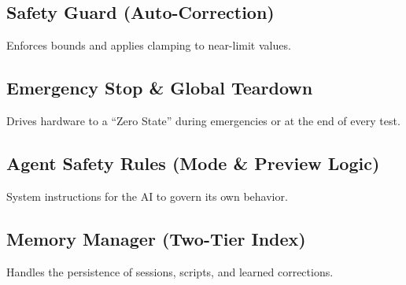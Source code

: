 \documentclass[conference]{IEEEtran}
\begin{document}
\subsection{Safety Guard (Auto-Correction)}
Enforces bounds and applies clamping to near-limit values.

\subsection{Emergency Stop \& Global Teardown}
Drives hardware to a ``Zero State'' during emergencies or at the end of every test.

\subsection{Agent Safety Rules (Mode \& Preview Logic)}
System instructions for the AI to govern its own behavior.

\subsection{Memory Manager (Two-Tier Index)}
Handles the persistence of sessions, scripts, and learned corrections.
\end{document}
